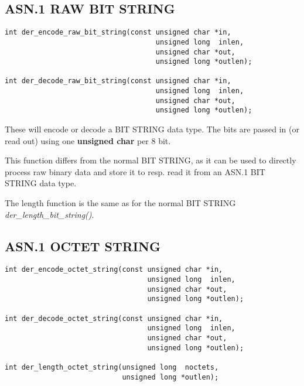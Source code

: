 \documentclass[synpaper]{book}
\begin{document}
\subsection{ASN.1 RAW BIT STRING}

\begin{verbatim}
int der_encode_raw_bit_string(const unsigned char *in,
                                    unsigned long  inlen,
                                    unsigned char *out,
                                    unsigned long *outlen);

int der_decode_raw_bit_string(const unsigned char *in,
                                    unsigned long  inlen,
                                    unsigned char *out,
                                    unsigned long *outlen);
\end{verbatim}

These will encode or decode a BIT STRING data type.
The bits are passed in (or read out) using one \textbf{unsigned char} per 8 bit.

This function differs from the normal BIT STRING, as it can be used to directly
process raw binary data and store it to resp. read it from an ASN.1 BIT STRING
data type.

The length function is the same as for the normal BIT STRING \textit{der\_length\_bit\_string()}.

\subsection{ASN.1 OCTET STRING}

\begin{verbatim}
int der_encode_octet_string(const unsigned char *in,
                                  unsigned long  inlen,
                                  unsigned char *out,
                                  unsigned long *outlen);

int der_decode_octet_string(const unsigned char *in,
                                  unsigned long  inlen,
                                  unsigned char *out,
                                  unsigned long *outlen);

int der_length_octet_string(unsigned long  noctets,
                            unsigned long *outlen);
\end{verbatim}
\end{document}
